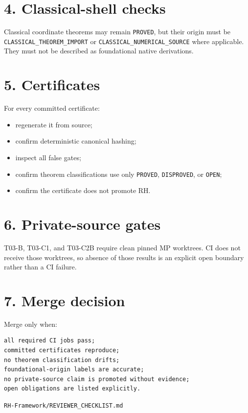 \hypertarget{classical-shell-checks}{%
\section{4. Classical-shell checks}\label{classical-shell-checks}}

Classical coordinate theorems may remain \texttt{PROVED}, but their origin must be \texttt{CLASSICAL\_THEOREM\_IMPORT} or \texttt{CLASSICAL\_NUMERICAL\_SOURCE} where applicable. They must not be described as foundational native derivations.

\hypertarget{certificates}{%
\section{5. Certificates}\label{certificates}}

For every committed certificate:

\begin{itemize}
\tightlist
\item
  regenerate it from source;
\item
  confirm deterministic canonical hashing;
\item
  inspect all false gates;
\item
  confirm theorem classifications use only \texttt{PROVED}, \texttt{DISPROVED}, or \texttt{OPEN};
\item
  confirm the certificate does not promote RH.
\end{itemize}

\hypertarget{private-source-gates}{%
\section{6. Private-source gates}\label{private-source-gates}}

T03-B, T03-C1, and T03-C2B require clean pinned MP worktrees. CI does not receive those worktrees, so absence of those results is an explicit open boundary rather than a CI failure.

\hypertarget{merge-decision}{%
\section{7. Merge decision}\label{merge-decision}}

Merge only when:

\begin{verbatim}
all required CI jobs pass;
committed certificates reproduce;
no theorem classification drifts;
foundational-origin labels are accurate;
no private-source claim is promoted without evidence;
open obligations are listed explicitly.
\end{verbatim}

\begin{flushright}\small\texttt{RH-Framework/REVIEWER\_CHECKLIST.md}\end{flushright}
